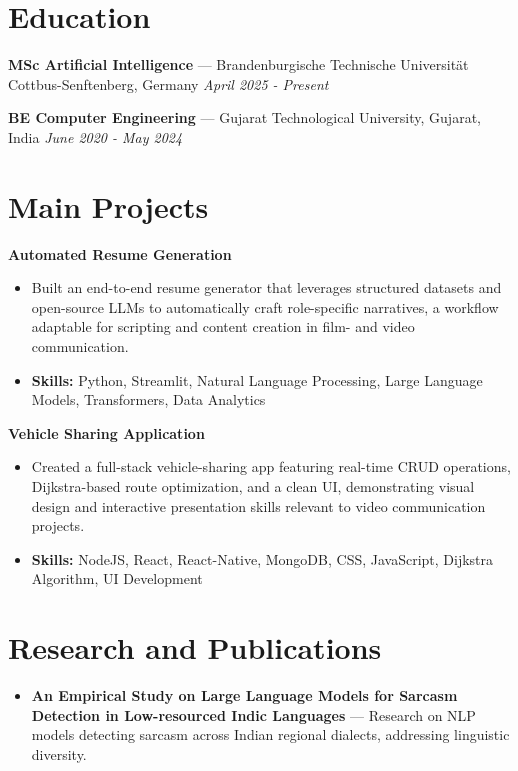 \documentclass[a4paper,10pt]{article}
\begin{document}
\section*{Education}
\textbf{MSc Artificial Intelligence} — Brandenburgische Technische Universität Cottbus-Senftenberg, Germany \hfill \textit{April 2025 - Present}\par
\vspace{1.5pt}
\textbf{BE Computer Engineering} — Gujarat Technological University, Gujarat, India \hfill \textit{June 2020 - May 2024}\par

\section*{Main Projects}
\textbf{Automated Resume Generation}\par
\vspace{1pt}
\begin{itemize}
  \item Built an end-to-end resume generator that leverages structured datasets and open-source LLMs to automatically craft role-specific narratives, a workflow adaptable for scripting and content creation in film- and video communication.
  \item \textbf{Skills:} Python, Streamlit, Natural Language Processing, Large Language Models, Transformers, Data Analytics
\end{itemize}
\vspace{3pt}
\textbf{Vehicle Sharing Application}\par
\vspace{1pt}
\begin{itemize}
  \item Created a full-stack vehicle-sharing app featuring real-time CRUD operations, Dijkstra-based route optimization, and a clean UI, demonstrating visual design and interactive presentation skills relevant to video communication projects.
  \item \textbf{Skills:} NodeJS, React, React-Native, MongoDB, CSS, JavaScript, Dijkstra Algorithm, UI Development
\end{itemize}

\section*{Research and Publications}
\begin{itemize}
\item \textbf{An Empirical Study on Large Language Models for Sarcasm Detection in Low-resourced Indic Languages} — Research on NLP models detecting sarcasm across Indian regional dialects, addressing linguistic diversity.
\end{itemize}
\end{document}
